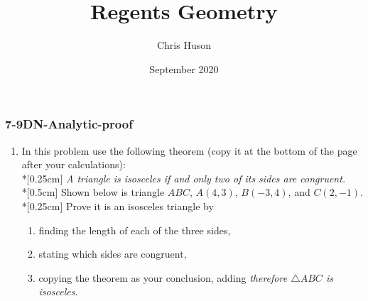 \documentclass[12pt, twoside]{article}
\title{Regents Geometry}
\author{Chris Huson}
\date{September 2020}
\begin{document}
\subsubsection*{7-9DN-Analytic-proof}
\begin{enumerate}
  \subsubsection*{Proof: Using the distance formula to prove an isosceles triangle}
\item In this problem use the following theorem (copy it at the bottom of the page after your calculations): \\*[0.25cm]
    \emph{A triangle is isosceles if and only two of its sides are congruent.}\\*[0.5cm]
    Shown below is triangle $ABC$, $A(4,3)$, $B(-3,4)$, and $C(2,-1)$. \\*[0.25cm]
    Prove it is an isosceles triangle by
    \begin{enumerate}
      \item finding the length of each of the three sides,
      \item stating which sides are congruent,
      \item copying the theorem as your conclusion, adding \emph{therefore $\triangle ABC$ is isosceles}.
    \end{enumerate}
    \begin{flushright} %
    \end{flushright}

\newpage

\end{enumerate}
\end{document}
